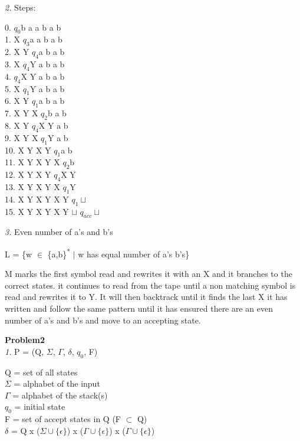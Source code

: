 \documentclass[12pt]{report}
\begin{document}
\textit{2.} Steps: 
\begin{addmargin}[1cm]{0em}
0.   $q_0$b a a b a b\\
1.   X $q_3$a a b a b\\
2.   X Y $q_4$a b a b\\
3.   X $q_4$Y a b a b\\
4.   $q_4$X Y a b a b\\
5.   X $q_1$Y a b a b\\
6.   X Y $q_1$a b a b\\
7.   X Y X $q_2$b a b\\
8.   X Y $q_4$X Y a b\\
9.   X Y X $q_1$Y a b\\
10. X Y X Y $q_1$a b\\
11. X Y X Y X $q_2$b\\
12. X Y X Y $q_4$X Y\\
13. X Y X Y X $q_1$Y\\
14. X Y X Y X Y $q_1\sqcup$\\
15. X Y X Y X Y $\sqcup$ $q_{acc}\sqcup$
\end{addmargin}

\pagebreak
\textit{3.} Even number of a's and b's\\
\begin{addmargin}[1cm]{0em}
L = \{w $\in$ \{a,b\}\textsuperscript{*} $\vert$ w has equal number of a's b's\}

M marks the first symbol read and rewrites it with an X and it branches to the correct states.  it continues to read from the tape until a non matching symbol is read and rewrites it to Y.  It will then backtrack until it finds the last X it has written and follow the same pattern until it has ensured there are an even number of a's and b's and move to an accepting state.
\end{addmargin}


\textbf{Problem2}\\
\textit{1.} P = (Q, $\Sigma$, $\Gamma$, $\delta$, $q_0$, F)\\
\begin{addmargin}[1cm]{0em}
Q = set of all states\\
$\Sigma$ = alphabet of the input\\
$\Gamma$ = alphabet of the stack(s)\\
$q_0$ = initial state\\
F = set of accept states in Q (F $\subset$ Q)\\
$\delta$ = Q x ($\Sigma \cup \{\epsilon\}$) x ($\Gamma \cup \{\epsilon\}$) x ($\Gamma \cup \{\epsilon\}$)\\
 \\
\end{addmargin}
\end{document}
